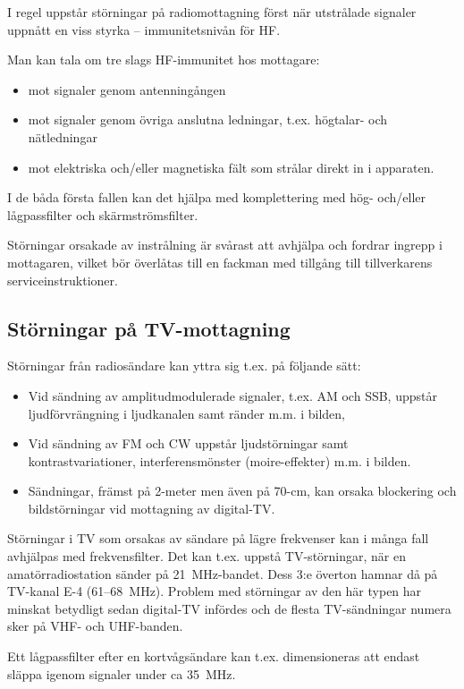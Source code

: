 I regel uppstår störningar på radiomottagning först när utstrålade signaler
uppnått en viss styrka -- immunitetsnivån för HF.

Man kan tala om tre slags HF-immunitet hos mottagare:
\begin{itemize}
\item mot signaler genom antenningången
\item mot signaler genom övriga anslutna ledningar, t.ex. högtalar-
  och nätledningar
\item mot elektriska och/eller magnetiska fält som strålar direkt in i
  apparaten.
\end{itemize}

I de båda första fallen kan det hjälpa med komplettering med hög- och/eller
lågpassfilter och skärmströmsfilter.

Störningar orsakade av instrålning är svårast att avhjälpa och fordrar ingrepp i
mottagaren, vilket bör överlåtas till en fackman med tillgång till
tillverkarens serviceinstruktioner.

\subsection{Störningar på TV-mottagning}

Störningar från radiosändare kan yttra sig t.ex. på följande sätt:
\begin{itemize}
\item Vid sändning av amplitudmodulerade signaler, t.ex. AM och SSB,
  uppstår ljudförvrängning i ljudkanalen samt ränder m.m. i bilden,
\item Vid sändning av FM och CW uppstår ljudstörningar samt
  kontrastvariationer, interferensmönster (moire-effekter) m.m. i bilden.
\item Sändningar, främst på 2-meter men även på 70-cm, kan orsaka blockering och
  bildstörningar vid mottagning av digital-TV.
\end{itemize}

Störningar i TV som orsakas av sändare på lägre frekvenser kan i många fall
avhjälpas med frekvensfilter.
Det kan t.ex. uppstå TV-störningar, när en amatörradiostation sänder på
21~MHz-bandet.
Dess 3:e överton hamnar då på TV-kanal E-4 (61--68~MHz).
Problem med störningar av den här typen har minskat betydligt sedan digital-TV
infördes och de flesta TV-sändningar numera sker på VHF- och UHF-banden.

Ett lågpassfilter efter en kortvågsändare kan t.ex. dimensioneras att endast
släppa igenom signaler under ca 35~MHz.

